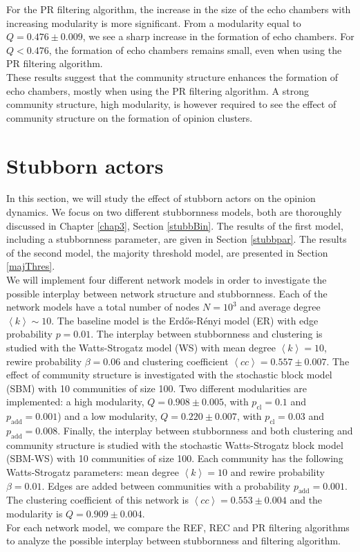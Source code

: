 \documentclass[11 pt , letterpaper , twoside , openright]{book}
\begin{document}
\newline
For the PR filtering algorithm, the increase in the size of the echo chambers with increasing modularity is more significant. From a modularity equal to $Q = 0.476 \pm 0.009$, we see a sharp increase in the formation of echo chambers. For $Q < 0.476$, the formation of echo chambers remains small, even when using the PR filtering algorithm.\\
\newline
These results suggest that the community structure enhances the formation of echo chambers, mostly when using the PR filtering algorithm. A strong community structure, high modularity, is however required to see the effect of community structure on the formation of opinion clusters.
\newpage
\section{Stubborn actors}

In this section, we will study the effect of stubborn actors on the opinion dynamics. We focus on two different stubbornness models, both are thoroughly discussed in Chapter \ref{chap3}, Section \ref{stubbBin}. The results of the first model, including a stubbornness parameter, are given in Section \ref{stubbpar}. The results of the second model, the majority threshold model, are presented in Section \ref{majThres}.\\
\newline
We will implement four different network models in order to investigate the possible interplay between network structure and stubbornness. Each of the network models have a total number of nodes $N=10^3$ and average degree $\left<k\right> \sim 10$. The baseline model is the Erd\H{o}s-R\'{e}nyi model (ER) with edge probability $p = 0.01$. The interplay between stubbornness and clustering is studied with the Watts-Strogatz model (WS) with mean degree $\left<k\right>=10$, rewire probability $\beta = 0.06$ and clustering coefficient $\left<cc\right> = 0.557 \pm 0.007$. The effect of community structure is investigated with the stochastic block model (SBM) with 10 communities of size 100. Two different modularities are implemented: a high modularity, $Q = 0.908 \pm 0.005$, with $p_{\text{cl}} = 0.1$ and $p_{\text{add}} = 0.001$) and a low modularity, $Q = 0.220 \pm 0.007$, with $p_{\text{cl}} = 0.03$ and $p_{\text{add}} = 0.008$. Finally, the interplay between stubbornness and both clustering and community structure is studied with the stochastic Watts-Strogatz block model (SBM-WS) with 10 communities of size 100. Each community has the following Watts-Strogatz parameters: mean degree $\left<k\right> = 10$ and rewire probability $\beta = 0.01$. Edges are added between communities with a probability $p_{\text{add}} = 0.001$. The clustering coefficient of this network is $\left<cc\right> = 0.553 \pm 0.004$ and the modularity is $Q = 0.909 \pm 0.004$.\\
\newline
For each network model, we compare the REF, REC and PR filtering algorithms to analyze the possible interplay between stubbornness and filtering algorithm.
\end{document}
